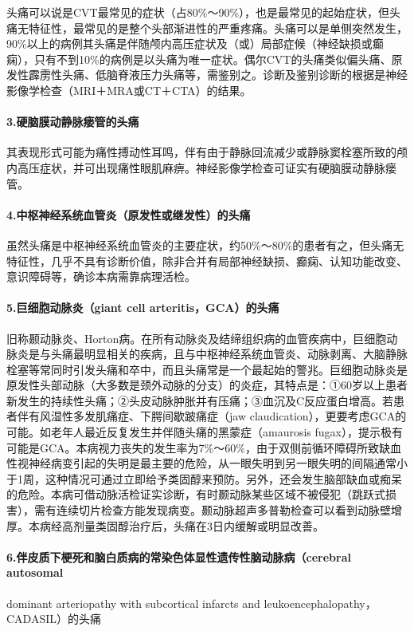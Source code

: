 头痛可以说是CVT最常见的症状（占80\%～90\%），也是最常见的起始症状，但头痛无特征性，最常见的是整个头部渐进性的严重疼痛。头痛可以是单侧突然发生，90\%以上的病例其头痛是伴随颅内高压症状及（或）局部症候（神经缺损或癫痫），只有不到10\%的病例是以头痛为唯一症状。偶尔CVT的头痛类似偏头痛、原发性霹雳性头痛、低脑脊液压力头痛等，需鉴别之。诊断及鉴别诊断的根据是神经影像学检查（MRI＋MRA或CT＋CTA）的结果。

\paragraph{3.硬脑膜动静脉瘘管的头痛}

其表现形式可能为痛性搏动性耳鸣，伴有由于静脉回流减少或静脉窦栓塞所致的颅内高压症状，并可出现痛性眼肌麻痹。神经影像学检查可证实有硬脑膜动静脉瘘管。

\paragraph{4.中枢神经系统血管炎（原发性或继发性）的头痛}

虽然头痛是中枢神经系统血管炎的主要症状，约50\%～80\%的患者有之，但头痛无特征性，几乎不具有诊断价值，除非合并有局部神经缺损、癫痫、认知功能改变、意识障碍等，确诊本病需靠病理活检。

\paragraph{5.巨细胞动脉炎（giant cell arteritis，GCA）的头痛}

旧称颞动脉炎、Horton病。在所有动脉炎及结缔组织病的血管疾病中，巨细胞动脉炎是与头痛最明显相关的疾病，且与中枢神经系统血管炎、动脉剥离、大脑静脉栓塞等常同时引发头痛和卒中，而且头痛常是一个最起始的警兆。巨细胞动脉炎是原发性头部动脉（大多数是颈外动脉的分支）的炎症，其特点是：①60岁以上患者新发生的持续性头痛；②头皮动脉肿胀并有压痛；③血沉及C反应蛋白增高。若患者伴有风湿性多发肌痛症、下腭间歇跛痛症（jaw
claudication），更要考虑GCA的可能。如老年人最近反复发生并伴随头痛的黑蒙症（amaurosis
fugax），提示极有可能是GCA。本病视力丧失的发生率为7\%～60\%，由于双侧前循环障碍所致缺血性视神经病变引起的失明是最主要的危险，从一眼失明到另一眼失明的间隔通常小于1周，这种情况可通过立即给予类固醇来预防。另外，还会发生脑部缺血或痴呆的危险。本病可借动脉活检证实诊断，有时颞动脉某些区域不被侵犯（跳跃式损害），需有连续切片检查方能发现病变。颞动脉超声多普勒检查可以看到动脉壁增厚。本病经高剂量类固醇治疗后，头痛在3日内缓解或明显改善。

\paragraph{6.伴皮质下梗死和脑白质病的常染色体显性遗传性脑动脉病（cerebral autosomal}
dominant arteriopathy with subcortical infarcts and
leukoencephalopathy，CADASIL）的头痛

